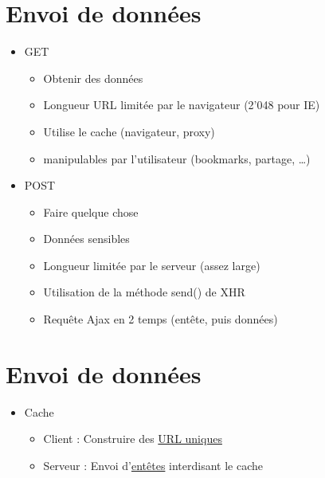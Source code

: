 \hypertarget{envoi-de-donnuxe9es}{%
\section{Envoi de données}\label{envoi-de-donnuxe9es}}

\begin{itemize}
\tightlist
\item
  GET

  \begin{itemize}
  \tightlist
  \item
    {Obtenir des données}
  \item
    Longueur URL limitée par le navigateur (2'048 pour IE)
  \item
    Utilise le cache (navigateur, proxy)
  \item
    manipulables par l'utilisateur (bookmarks, partage, \ldots{})
  \end{itemize}
\item
  POST

  \begin{itemize}
  \tightlist
  \item
    {Faire quelque chose}
  \item
    Données sensibles
  \item
    Longueur limitée par le serveur (assez large)
  \item
    Utilisation de la méthode send() de XHR
  \item
    Requête Ajax en 2 temps (entête, puis données)
  \end{itemize}
\end{itemize}

\hypertarget{envoi-de-donnuxe9es-1}{%
\section{Envoi de données}\label{envoi-de-donnuxe9es-1}}

\begin{itemize}
\tightlist
\item
  Cache

  \begin{itemize}
  \tightlist
  \item
    Client : Construire des
    \href{http://stackoverflow.com/questions/367786/prevent-browser-caching-of-jquery-ajax-call-result}{URL
    uniques}
  \item
    Serveur : Envoi
    d'\href{https://developers.google.com/web/fundamentals/performance/optimizing-content-efficiency/http-caching}{entêtes}
    interdisant le cache
  \end{itemize}
\end{itemize}

